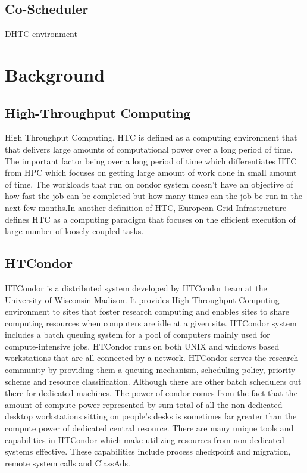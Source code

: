 \documentclass[ms,electronic,double]{nuthesis}
\begin{document}
\section{Co-Scheduler}

DHTC environment


\chapter{Background}

\section{High-Throughput Computing} High Throughput Computing, HTC is defined as 
a computing environment that that delivers large amounts of computational
power over a long period of time.  The important factor being over a long period of time which 
differentiates HTC from HPC which focuses on getting large amount of work done in small amount of time.
The workloads that run on condor system doesn't have an objective of  how fast the job can be completed 
but how many times can the job be run in the next few months.In another definition of HTC, European Grid  
Infrastructure defines HTC as a computing paradigm that focuses on the efficient 
execution of large number of loosely coupled tasks.


\section{HTCondor} HTCondor is a distributed system developed by HTCondor team at the 
University of Wisconsin-Madison. It provides High-Throughput Computing environment to sites 
that foster research computing and enables sites to share computing resources when 
computers are idle at a given site. HTCondor system includes a batch queuing 
system for a pool of computers mainly used for compute-intensive jobs, HTCondor runs on both
 UNIX and windows based workstations that are all connected by a network.  
 HTCondor serves the research community by providing them a queuing mechanism, 
 scheduling policy, priority scheme and resource classification. Although there are other 
 batch schedulers out there for dedicated machines. The power of condor comes from 
 the fact that  the amount of compute power represented by sum total of all the 
 non-dedicated desktop workstations sitting on people's desks is sometimes far 
 greater than the compute power of dedicated central resource. There are many 
 unique tools and capabilities in HTCondor which make utilizing resources from 
 non-dedicated systems effective. These capabilities include process checkpoint 
 and migration, remote system calls and ClassAds.
 
\end{document}
